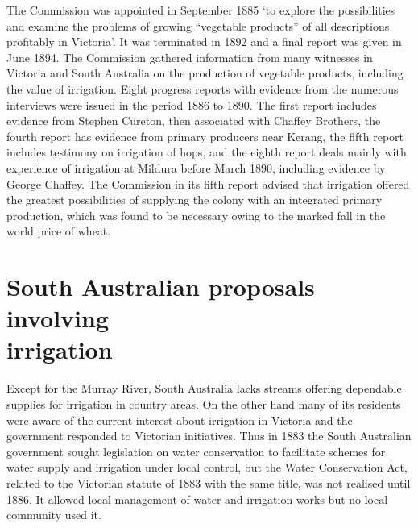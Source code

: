 The Commission was appointed in September 1885 `to explore the
possibilities and examine the problems of growing ``vegetable
products'' of all descriptions profitably in Victoria'.  It was
terminated in 1892 and a final report was given in June 1894.  The
Commission gathered information from many witnesses in Victoria and
South Australia on the production of vegetable products, including the
value of irrigation.  Eight progress reports with evidence from the
numerous interviews were issued in the period 1886 to 1890.  The first
report includes evidence from Stephen Cureton, 
then associated with Chaffey Brothers,  the fourth
report has evidence from primary producers near Kerang, the fifth
report includes testimony on irrigation of hops, and the eighth report
deals mainly with experience of irrigation at Mildura   before March 1890, including evidence by George
Chaffey.   The Commission in its fifth report
advised that irrigation offered the greatest possibilities of
supplying the colony with an integrated primary production, which was
found to be necessary owing to the marked fall in the world price of
wheat.

\section*{South Australian proposals involving\\ irrigation}

Except for the Murray River, South Australia lacks streams offering
dependable supplies for irrigation in country areas.  On the other
hand many of its residents were aware of the current interest about
irrigation in Victoria and the government responded to Victorian
initiatives.  Thus in 1883 the South Australian government sought
legislation on water conservation to facilitate schemes for water
supply and irrigation under local control, but the Water Conservation
Act,  related to the
Victorian statute of 1883 with the same title, was not realised until
1886.  It allowed local management of water and irrigation works but
no local community used it.

